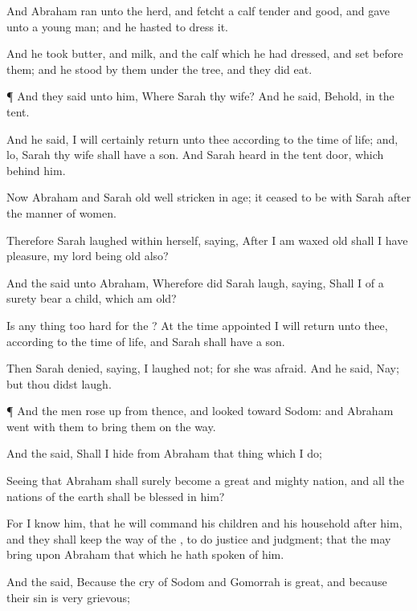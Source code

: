 {And
Abraham
ran unto the
herd, and
fetcht a
calf
tender and
good, and
gave
{} unto a young
man; and he
hasted to
dress it.

And he
took
butter, and
milk, and the
calf which he had
dressed, and
set
{} before
them; and he
stood by them under the
tree, and they did
eat.


\par }{\PP {}¶ And they
said unto him,
Where
{}
Sarah thy
wife? And he
said, Behold, in the
tent.

And he
said, I will
certainly
return unto thee according to the
time of
life; and, lo,
Sarah thy
wife shall have a
son. And
Sarah
heard
{} in the
tent
door, which
{} behind
him.

Now
Abraham and
Sarah
{}
old
{} well
stricken in
age;
{} it
ceased to be with
Sarah after the
manner of
women.

Therefore
Sarah
laughed within
herself,
saying,
After I am waxed
old shall I have
pleasure, my
lord being old
also?

And the
{}
said unto
Abraham,
Wherefore did
Sarah
laugh,
saying, Shall I of a
surety
bear a child,
which am
old?

Is any
thing too
hard for the
{}? At the time
appointed I will
return unto thee, according to the
time of
life, and
Sarah shall have a
son.

Then
Sarah
denied,
saying, I
laughed not; for she was
afraid. And he
said,
Nay; but thou didst
laugh.


\par }{\PP {}¶ And the
men rose
up from thence, and
looked
toward
Sodom: and
Abraham
went with them to bring them on the
way.

And the
{}
said, Shall I
hide from
Abraham that thing
which I
do;

Seeing that
Abraham shall surely become a
great and
mighty
nation, and all the
nations of the
earth shall be
blessed in him?

For I
know him,
that he will
command his
children and his
household after
him, and they shall
keep the
way of the
{}, to
do
justice and
judgment; that the
{} may
bring upon
Abraham that which he hath
spoken of him.

And the
{}
said, Because the
cry of
Sodom and
Gomorrah is
great, and because their
sin is
very
grievous;

}
